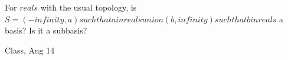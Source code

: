 \begin{samepage}
\begin{ex}
    For $reals$ with the usual topology, is $S = {{ (- infinity, a) such that a in reals }} union {{ (b, infinity) such that b in reals }}$ a basis? Is it a subbasis?
\end{ex}
\begin{source}
Class, Aug 14
\end{source}
\end{samepage}
